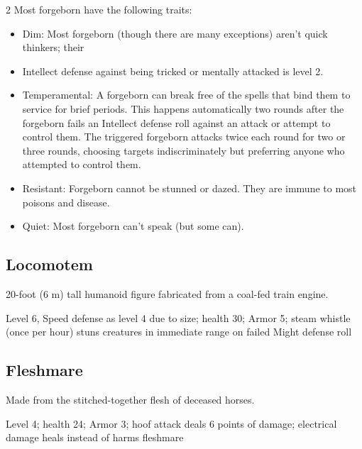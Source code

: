 \begin{multicols}{2}
Most forgeborn have the following traits:
\begin{itemize}
\item	Dim: Most forgeborn (though there are many exceptions) aren’t quick thinkers; their
\item	Intellect defense against being tricked or mentally attacked is level 2.
\item	Temperamental: A forgeborn can break free of the spells that bind them to service for brief periods. This happens automatically two rounds after the forgeborn fails an Intellect defense roll against an attack or attempt to control them. The triggered forgeborn attacks twice each round for two or three rounds, choosing targets indiscriminately but preferring anyone who attempted to control them.
\item	Resistant: Forgeborn cannot be stunned or dazed. They are immune to most poisons and disease.
\item	Quiet: Most forgeborn can’t speak (but some can).
\end{itemize}

\subsection{Locomotem}

20-foot (6 m) tall humanoid figure fabricated from a coal-fed train engine. 

Level 6, Speed defense as level 4 due to size; health 30; Armor 5; steam whistle (once per hour) stuns creatures in immediate range on failed Might defense roll 

\subsection{Fleshmare}

Made from the stitched-together flesh of deceased horses. 

Level 4; health 24; Armor 3; hoof attack deals 6 points of damage; electrical damage heals instead of harms fleshmare 


\end{multicols}
